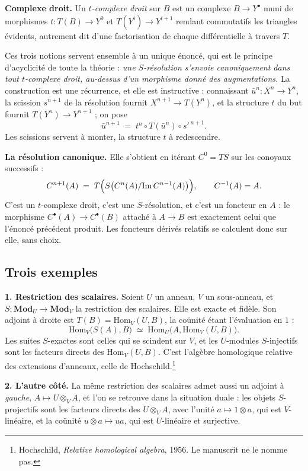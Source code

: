 \documentclass[11pt,a4paper]{article}
\begin{document}
\textbf{Complexe droit.} Un \emph{$t$-complexe droit} sur $B$ est un complexe
$B \to Y^{\bullet}$ muni de morphismes $t : T(B) \to Y^{0}$ et
$T(Y^{i}) \to Y^{i+1}$ rendant commutatifs les triangles évidents, autrement
dit d'une factorisation de chaque différentielle à travers $T$.

Ces trois notions servent ensemble à un unique énoncé, qui est le principe
d'acyclicité de toute la théorie : \emph{une $S$-résolution s'envoie
canoniquement dans tout $t$-complexe droit, au-dessus d'un morphisme donné des
augmentations.} La construction est une récurrence, et elle est instructive :
connaissant $\bar{u}^{n} : X^{n} \to Y^{n}$, la scission $s^{n+1}$ de la
résolution fournit $X^{n+1} \to T(Y^{n})$, et la structure $t$ du but fournit
$T(Y^{n}) \to Y^{n+1}$ ; on pose
\[
  \bar{u}^{n+1} \;=\; t^{n} \circ T(\bar{u}^{n}) \circ s'^{\,n+1} .
\]
Les scissions servent à monter, la structure $t$ à redescendre.


\textbf{La résolution canonique.} Elle s'obtient en itérant $C^{0} = TS$ sur
les conoyaux successifs :
\[
  C^{n+1}(A) \;=\; T\Bigl( S\bigl( C^{n}(A) / \mathrm{Im}\,C^{n-1}(A) \bigr)
  \Bigr) , \qquad C^{-1}(A) = A .
\]
C'est un $t$-complexe droit, c'est une $S$-résolution, et c'est un foncteur en
$A$ : le morphisme $C^{\bullet}(A) \to C^{\bullet}(B)$ attaché à $A \to B$ est
exactement celui que l'énoncé précédent produit. Les foncteurs dérivés relatifs
se calculent donc sur elle, sans choix.

\subsection*{Trois exemples}

\textbf{1. Restriction des scalaires.} Soient $U$ un anneau, $V$ un
sous-anneau, et $S : \mathbf{Mod}_{U} \to \mathbf{Mod}_{V}$ la restriction des
scalaires. Elle est exacte et fidèle. Son adjoint à droite est
$T(B) = \mathrm{Hom}_{V}(U, B)$, la coünité étant l'évaluation en $1$ :
\[
  \mathrm{Hom}_{V}\bigl( S(A), B \bigr) \;\simeq\;
  \mathrm{Hom}_{U}\bigl( A, \mathrm{Hom}_{V}(U, B) \bigr) .
\]
Les suites $S$-exactes sont celles qui se scindent sur $V$, et les $U$-modules
$S$-injectifs sont les facteurs directs des $\mathrm{Hom}_{V}(U, B)$. C'est
l'algèbre homologique relative des extensions d'anneaux, celle de
Hochschild.\footnote{Hochschild, \emph{Relative homological algebra}, 1956. Le
manuscrit ne le nomme pas.}

\textbf{2. L'autre côté.} La même restriction des scalaires admet aussi un
adjoint à \emph{gauche}, $A \mapsto U \otimes_{V} A$, et l'on se retrouve dans
la situation duale : les objets $S$-projectifs sont les facteurs directs des
$U \otimes_{V} A$, avec l'unité $a \mapsto 1 \otimes a$, qui est
$V$-linéaire, et la coünité $u \otimes a \mapsto ua$, qui est $U$-linéaire et
surjective.
\end{document}
